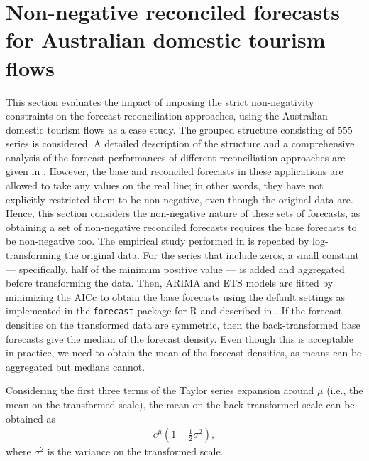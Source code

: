 \documentclass[11pt]{article}
\newcommand{\0}{\phantom{0}}
\begin{document}
\section{Non-negative reconciled forecasts for Australian domestic tourism flows}
\label{sec:AUSNN}
This section evaluates the impact of imposing the strict non-negativity constraints on the forecast reconciliation approaches, using the Australian domestic tourism flows as a case study. The grouped structure consisting of 555 series is considered. A detailed description of the structure and a comprehensive analysis of the forecast performances of different reconciliation approaches are given in \citet{Wick2018}. However, the base and reconciled forecasts in these applications are allowed to take any values on the real line; in other words, they have not explicitly restricted them to be non-negative, even though the original data are. Hence, this section considers the non-negative nature of these sets of forecasts, as obtaining a set of non-negative reconciled forecasts requires the base forecasts to be non-negative too. The empirical study performed in \citet{Wick2018} is repeated by log-transforming the original data. For the series that include zeros, a small constant --- specifically, half of the minimum positive value --- is added and aggregated before transforming the data. Then, ARIMA and ETS models are fitted by minimizing the AICc to obtain the base forecasts using the default settings as implemented in the \texttt{forecast} package for R \citet{forecast2016} and described in \citet{Hyndman2008}. If the forecast densities on the transformed data are symmetric, then the back-transformed base forecasts give the median of the forecast density. Even though this is acceptable in practice, we need to obtain the mean of the forecast densities, as means can be aggregated but medians cannot.

Considering the first three terms of the Taylor series expansion around $\mu$ (i.e., the mean on the transformed scale), the mean on the back-transformed scale can be obtained as
\begin{align*}
e^{\mu}\left(1 + \frac{1}{2}\sigma^{2}\right),
\end{align*} 
where $\sigma^{2}$ is the variance on the transformed scale.
\end{document}
